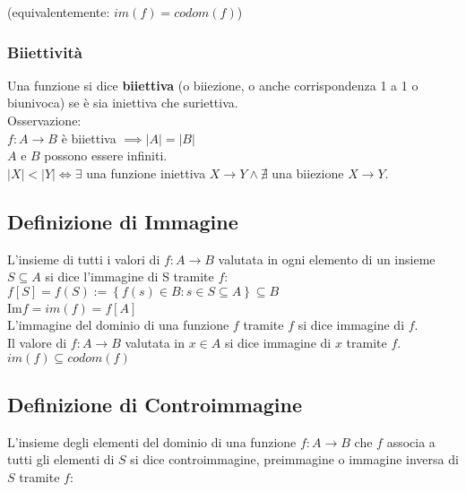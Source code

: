 \documentclass[a4paper, twoside, italian, 11pt]{book}
\newcommand{\braces}[1] {\left\{#1\right\}}
\begin{document}
\noindent
(equivalentemente: $im(f) = codom(f)$)


\subsubsection{Biiettività}

Una funzione si dice \textbf{biiettiva} (o biiezione, o anche corrispondenza 1 a 1 o biunivoca) se è sia iniettiva che suriettiva. \\

\noindent
Osservazione: \\

$f : A \rightarrow B$ è biiettiva $\implies \left | A \right | = \left | B \right |$ \\

\noindent
$A$ e $B$ possono essere infiniti. \\

\noindent
$\left | X \right | < \left | Y \right | \iff \exists$ una funzione iniettiva $X \rightarrow Y \land \nexists$ una biiezione $X \rightarrow Y$.


\subsection{Definizione di Immagine}

L'insieme di tutti i valori di $f : A \rightarrow B$ valutata in ogni elemento di un insieme $S \subseteq A$ si dice l'immagine di S tramite $f$: \\

$f[S] = f(S) := \braces{f(s) \in B : s \in S \subseteq A} \subseteq B$ \\

Im$f = im(f) = f[A]$ \\

\noindent
L'immagine del dominio di una funzione $f$ tramite $f$ si dice immagine di $f$.\\

\noindent
Il valore di $f : A \rightarrow B$ valutata in $x \in A$ si dice immagine di $x$ tramite $f$. \\

\noindent
$im(f) \subseteq codom(f)$


\subsection{Definizione di Controimmagine}

L'insieme degli elementi del dominio di una funzione $f : A \rightarrow B$ che $f$ associa a tutti gli elementi di $S$ si dice controimmagine, preimmagine o immagine inversa di $S$ tramite $f$: \\
\end{document}
